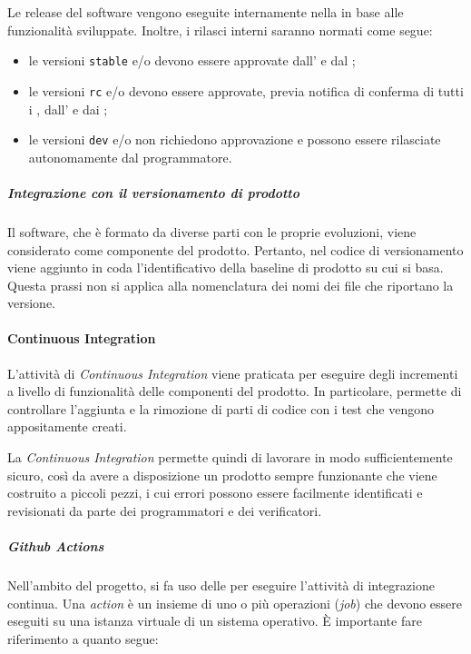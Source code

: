 		Le release del software vengono eseguite internamente nella  in base alle funzionalità sviluppate. Inoltre, i rilasci interni saranno normati come segue:
		\begin{itemize}
			\item le versioni \verb!stable! e/o  devono essere approvate dall' e dal ;
			\item le versioni \verb!rc! e/o  devono essere approvate, previa notifica di conferma di tutti i , dall' e dai ;
			\item le versioni \verb!dev! e/o  non richiedono approvazione e possono essere rilasciate autonomamente dal programmatore.
		\end{itemize}

		\subparagraph{Integrazione con il versionamento di prodotto}

		Il software, che è formato da diverse parti con le proprie evoluzioni, viene considerato come componente del prodotto. Pertanto, nel codice di versionamento viene aggiunto in coda l'identificativo della baseline di prodotto su cui si basa. Questa prassi non si applica alla nomenclatura dei nomi dei file che riportano la versione.

	\paragraph{Continuous Integration}

	L'attività di \textit{Continuous Integration} viene praticata per eseguire degli incrementi a livello di funzionalità delle componenti del prodotto. In particolare, permette di controllare l'aggiunta e la rimozione di parti di codice con i test che vengono appositamente creati.

	La \textit{Continuous Integration} permette quindi di lavorare in modo sufficientemente sicuro, così da avere a disposizione un prodotto sempre funzionante che viene costruito a piccoli pezzi, i cui errori possono essere facilmente identificati e revisionati da parte dei programmatori e dei verificatori.

		\subparagraph{Github Actions}

		Nell'ambito del progetto, si fa uso delle  per eseguire l'attività di integrazione continua. Una \textit{action} è un insieme di uno o più operazioni (\textit{job}) che devono essere eseguiti su una istanza virtuale di un sistema operativo. È importante fare riferimento a quanto segue:

